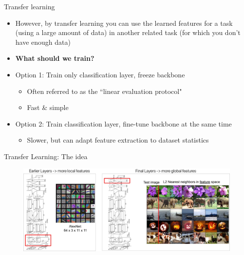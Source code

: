 \documentclass[serif, aspectratio=169]{beamer}
\begin{document}
\begin{frame}{Transfer learning}
	\begin{itemize}
		\item However, by transfer learning you can use the learned features for a task (using a large amount of data) in another related task (for which you don’t have enough data)
		\item \textbf{What should we train?}
		\item Option 1: Train only classification layer, freeze backbone

		\begin{itemize}
			\item Often referred to as the ``linear evaluation protocol"
			\item Fast \& simple
		\end{itemize}
		\item Option 2: Train classification layer, fine-tune backbone at the same time

		\begin{itemize}
			\item Slower, but can adapt feature extraction to dataset statistics
		\end{itemize}
	\end{itemize}
\end{frame}

\begin{frame}{Transfer Learning: The idea}
	\vspace{-1em}
	\begin{figure}[htpb]
		\begin{center}
			\includegraphics[keepaspectratio, scale=0.23]{pic/TL_alexnet}
		\end{center}
	\end{figure}
\end{frame}
\end{document}
